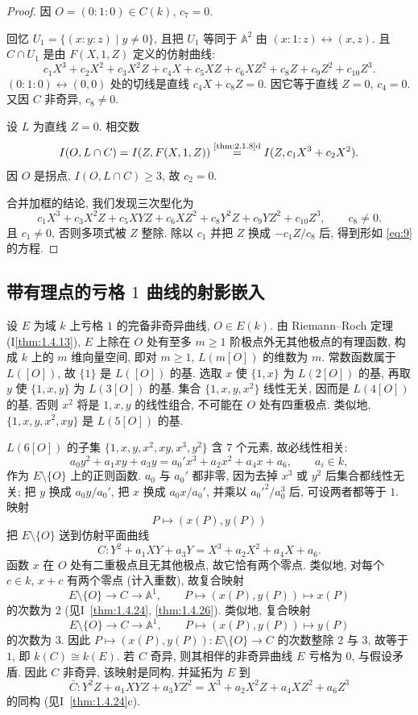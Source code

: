 \begin{proof}
因 $O = (0:1:0)\in C(k)$, $c_7 = 0$.

回忆 $U_1 = \{(x:y:z) \mid y\neq 0\}$, 且把 $U_1$ 等同于 $\mathbb{A}^2$ 由 $(x:1:z)\leftrightarrow(x,z)$. 且 $C\cap U_1$ 是由 $F(X,1,Z)$ 定义的仿射曲线:
\[
c_1X^3 + c_2X^2 + c_3X^2Z + c_4X + c_5XZ + c_6XZ^2 + c_8Z + c_9Z^2 + c_{10}Z^3.
\]
$(0:1:0)\leftrightarrow(0,0)$ 处的切线是直线 $c_4X + c_8Z = 0$. 因它等于直线 $Z = 0$, $c_4 = 0$. 又因 $C$ 非奇异, $c_8\neq 0$.

设 $L$ 为直线 $Z = 0$. 相交数
\[
I(O, L\cap C) = I(Z, F(X,1,Z)) \overset{\text{\ref{thm:2.1.8}d}}{=} I(Z, c_1X^3 + c_2X^2).
\]
因 $O$ 是拐点, $I(O, L\cap C)\ge 3$, 故 $c_2 = 0$.

合并加框的结论, 我们发现三次型化为
\[
c_1X^3 + c_3X^2Z + c_5XYZ + c_6XZ^2 + c_8Y^2Z + c_9YZ^2 + c_{10}Z^3, \qquad c_8\neq 0.
\]
且 $c_1\neq 0$, 否则多项式被 $Z$ 整除. 除以 $c_1$ 并把 $Z$ 换成 $-c_1Z/c_8$ 后, 得到形如 \eqref{eq:9} 的方程.
\end{proof}

\subsection*{带有理点的亏格 $1$ 曲线的射影嵌入}\label{subsec:genus1-embedding}
设 $E$ 为域 $k$ 上亏格 $1$ 的完备非奇异曲线, $O\in E(k)$. 由 Riemann--Roch 定理 (I\ref{thm:1.4.13}), $E$ 上除在 $O$ 处有至多 $m\ge 1$ 阶极点外无其他极点的有理函数, 构成 $k$ 上的 $m$ 维向量空间, 即对 $m\ge 1$, $L(m[O])$ 的维数为 $m$. 常数函数属于 $L([O])$, 故 $\{1\}$ 是 $L([O])$ 的基. 选取 $x$ 使 $\{1,x\}$ 为 $L(2[O])$ 的基, 再取 $y$ 使 $\{1,x,y\}$ 为 $L(3[O])$ 的基. 集合 $\{1,x,y,x^2\}$ 线性无关, 因而是 $L(4[O])$ 的基, 否则 $x^2$ 将是 $1,x,y$ 的线性组合, 不可能在 $O$ 处有四重极点. 类似地, $\{1,x,y,x^2,xy\}$ 是 $L(5[O])$ 的基.

$L(6[O])$ 的子集 $\{1,x,y,x^2,xy,x^3,y^2\}$ 含 $7$ 个元素, 故必线性相关:
\[
a_0y^2 + a_1xy + a_3y = a_0'x^3 + a_2x^2 + a_4x + a_6, \qquad a_i\in k,
\]
作为 $E\setminus\{O\}$ 上的正则函数. $a_0$ 与 $a_0'$ 都非零, 因为去掉 $x^3$ 或 $y^2$ 后集合都线性无关; 把 $y$ 换成 $a_0y/a_0'$, 把 $x$ 换成 $a_0x/a_0'$, 并乘以 $a_0'^2/a_0^3$ 后, 可设两者都等于 $1$. 映射
\[
P\mapsto(x(P), y(P))
\]
把 $E\setminus\{O\}$ 送到仿射平面曲线
\[
C\colon Y^2 + a_1XY + a_3Y = X^3 + a_2X^2 + a_4X + a_6.
\]
函数 $x$ 在 $O$ 处有二重极点且无其他极点, 故它恰有两个零点. 类似地, 对每个 $c\in k$, $x + c$ 有两个零点 (计入重数), 故复合映射
\[
E\setminus\{O\}\to C\to\mathbb{A}^1, \qquad
P\mapsto(x(P), y(P))\mapsto x(P)
\]
的次数为 $2$ (见I~\ref{thm:1.4.24}, \ref{thm:1.4.26}). 类似地, 复合映射
\[
E\setminus\{O\}\to C\to\mathbb{A}^1, \qquad
P\mapsto(x(P), y(P))\mapsto y(P)
\]
的次数为 $3$. 因此 $P\mapsto(x(P), y(P))\colon E\setminus\{O\}\to C$ 的次数整除 $2$ 与 $3$, 故等于 $1$, 即 $k(C)\cong k(E)$. 若 $C$ 奇异, 则其相伴的非奇异曲线 $E$ 亏格为 $0$, 与假设矛盾. 因此 $C$ 非奇异, 该映射是同构, 并延拓为 $E$ 到
\[
\bar{C}\colon Y^2Z + a_1XYZ + a_3YZ^2 = X^3 + a_2X^2Z + a_4XZ^2 + a_6Z^3
\]
的同构 (见I~\ref{thm:1.4.24}c).

